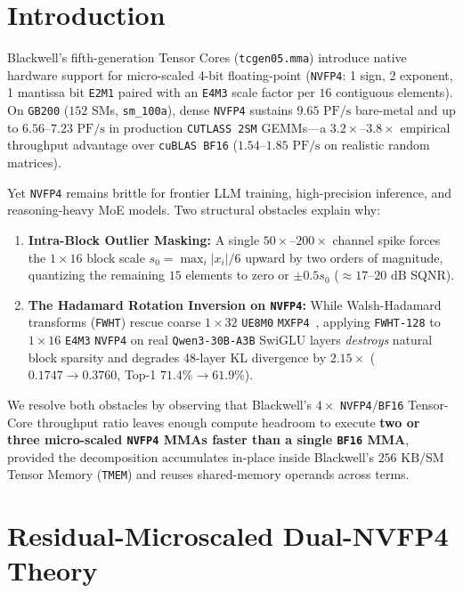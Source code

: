 \documentclass[conference,10pt]{IEEEtran}
\begin{document}
\section{Introduction}
Blackwell's fifth-generation Tensor Cores (\texttt{tcgen05.mma}) introduce native hardware support for micro-scaled 4-bit floating-point (\texttt{NVFP4}: 1 sign, 2 exponent, 1 mantissa bit \texttt{E2M1} paired with an \texttt{E4M3} scale factor per $16$ contiguous elements). On \texttt{GB200} ($152$ SMs, \texttt{sm\_100a}), dense \texttt{NVFP4} sustains $9.65\text{ PF/s}$ bare-metal and up to $6.56$--$7.23\text{ PF/s}$ in production \texttt{CUTLASS 2SM} GEMMs---a $3.2\times$--$3.8\times$ empirical throughput advantage over \texttt{cuBLAS BF16} ($1.54$--$1.85\text{ PF/s}$ on realistic random matrices).

Yet \texttt{NVFP4} remains brittle for frontier LLM training, high-precision inference, and reasoning-heavy MoE models. Two structural obstacles explain why:
\begin{enumerate}
    \item \textbf{Intra-Block Outlier Masking:} A single $50\times$--$200\times$ channel spike forces the $1{\times}16$ block scale $s_0 = \max_i |x_i|/6$ upward by two orders of magnitude, quantizing the remaining $15$ elements to zero or $\pm 0.5 s_0$ ($\approx 17$--$20\text{ dB}$ SQNR).
    \item \textbf{The Hadamard Rotation Inversion on \texttt{NVFP4}:} While Walsh-Hadamard transforms (\texttt{FWHT}) rescue coarse $1{\times}32$ \texttt{UE8M0} \texttt{MXFP4}~\cite{tseng2024quip,ashkboos2024quarot}, applying \texttt{FWHT-128} to $1{\times}16$ \texttt{E4M3} \texttt{NVFP4} on real \texttt{Qwen3-30B-A3B} SwiGLU layers \emph{destroys} natural block sparsity and degrades 48-layer KL divergence by $2.15\times$ ($0.1747 \to 0.3760$, Top-1 $71.4\% \to 61.9\%$).
\end{enumerate}

We resolve both obstacles by observing that Blackwell's $4\times$ \texttt{NVFP4}/\texttt{BF16} Tensor-Core throughput ratio leaves enough compute headroom to execute \textbf{two or three micro-scaled \texttt{NVFP4} MMAs faster than a single \texttt{BF16} MMA}, provided the decomposition accumulates in-place inside Blackwell's $256\text{ KB/SM}$ Tensor Memory (\texttt{TMEM}) and reuses shared-memory operands across terms.

\section{Residual-Microscaled Dual-NVFP4 Theory}
\end{document}
